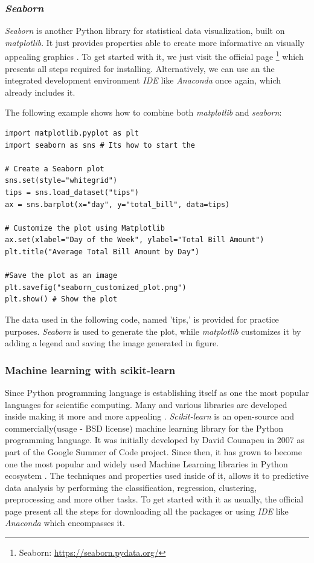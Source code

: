 \documentclass[12pt,a4paper]{report}
\begin{document}
\subsubsection*{\textit{Seaborn}}
\textit{Seaborn} is another Python library for statistical data visualization, built on \textit{matplotlib}. It just provides properties able to create more informative an visually appealing graphics \cite{sial2021comparative}. To get started with it, we just visit the official page \footnote{Seaborn: \url{https://seaborn.pydata.org/}} which presents all steps required for installing. Alternatively, we can use an  the integrated development environment \textit{IDE} like \textit{Anaconda} once again, which already includes it. 

The following example shows how to combine both \textit{matplotlib} and \textit{seaborn}:  
\begin{lstlisting}[style=stylepython]
import matplotlib.pyplot as plt 
import seaborn as sns # Its how to start the 

# Create a Seaborn plot
sns.set(style="whitegrid")
tips = sns.load_dataset("tips")
ax = sns.barplot(x="day", y="total_bill", data=tips)

# Customize the plot using Matplotlib
ax.set(xlabel="Day of the Week", ylabel="Total Bill Amount")
plt.title("Average Total Bill Amount by Day")

#Save the plot as an image
plt.savefig("seaborn_customized_plot.png")
plt.show() # Show the plot
\end{lstlisting} 
The data used in the following code, named 'tips,' is provided for practice purposes. \textit{Seaborn} is used to generate the plot, while \textit{matplotlib} customizes it by adding a legend and saving the image generated in figure.


\subsubsection*{\large Machine learning with scikit-learn} 
  
Since Python programming language is establishing itself as one the most popular languages for scientific computing. Many and various libraries are developed inside making it more and more appealing \cite{pedregosa2011scikit}. \newline
\textit{Scikit-learn} is an open-source and commercially(usage - BSD license) machine learning library for the Python programming language. It was initially developed by David Counapeu in 2007 as part of the Google Summer of Code project. Since then, it has grown to become one the most popular and widely used Machine Learning libraries in Python ecosystem \cite{scikitlearnCode1}.   
The techniques and properties used inside of it, allows it to predictive data analysis by performing the  classification, regression, clustering, preprocessing and more other tasks.\newline
To get started with it as usually, the official page present all the steps for downloading all the packages or using \textit{IDE} like \textit{Anaconda} which encompasses it. 
\end{document}
